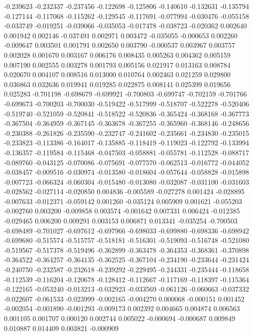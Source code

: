 -0.239623
-0.232337
-0.237456
-0.122698
-0.125806
-0.140610
-0.132631
-0.135794
-0.127144
-0.117068
-0.115262
-0.129545
-0.117691
-0.077994
-0.030476
-0.055158
-0.033749
-0.019251
-0.039066
-0.035053
-0.017478
-0.038723
-0.020362
0.002640
0.001942
0.002146
-0.037491
0.002971
0.003472
-0.035055
-0.000653
0.002260
-0.009647
0.003501
0.001791
0.002650
0.003790
-0.000537
0.003967
0.003757
0.002028
0.001670
0.003167
0.006176
0.008435
0.005263
0.004362
0.005159
0.007190
0.002555
0.003278
0.001793
0.005156
0.021917
0.013163
0.008784
0.020670
0.004107
0.008516
0.013000
0.010764
0.002463
0.021259
0.029800
0.036863
0.032636
0.019941
0.019285
0.022875
0.008141
0.025399
0.019656
0.025283
-0.701198
-0.698679
-0.699921
-0.700803
-0.699747
-0.702159
-0.701766
-0.699673
-0.700203
-0.700030
-0.519422
-0.517999
-0.518707
-0.522278
-0.520406
-0.519740
-0.521059
-0.520841
-0.518522
-0.520836
-0.365424
-0.368168
-0.367773
-0.367504
-0.364959
-0.367145
-0.363678
-0.367255
-0.365960
-0.368146
-0.248656
-0.230388
-0.261826
-0.235590
-0.232747
-0.241602
-0.235661
-0.234830
-0.235015
-0.233823
-0.113386
-0.164017
-0.135885
-0.118419
-0.119023
-0.122792
-0.133994
-0.136357
-0.119584
-0.115468
-0.047503
-0.058881
-0.055781
-0.112528
-0.088717
-0.089760
-0.043125
-0.070086
-0.075691
-0.077570
-0.062513
-0.016772
-0.044052
-0.038457
-0.009516
-0.030974
-0.013580
-0.018604
-0.057644
-0.058828
-0.015898
-0.007723
-0.066324
-0.060304
-0.015480
-0.013080
-0.032087
-0.031100
-0.031603
-0.028562
-0.027114
-0.020850
0.004836
-0.005589
-0.027278
0.001424
-0.028895
-0.007633
-0.012371
-0.059142
0.001260
-0.035124
0.005909
0.001621
-0.055203
-0.002760
0.003200
-0.009858
0.003574
-0.001642
0.007331
0.006424
-0.012385
-0.029465
0.006200
0.009291
0.003153
0.006871
0.013341
-0.035254
-0.700503
-0.698489
-0.701027
-0.697612
-0.697966
-0.698033
-0.699880
-0.698336
-0.698942
-0.699680
-0.515574
-0.515757
-0.518181
-0.516301
-0.519093
-0.516748
-0.521080
-0.519567
-0.517378
-0.519496
-0.362899
-0.363478
-0.364353
-0.368361
-0.370898
-0.364522
-0.364257
-0.364135
-0.362525
-0.367104
-0.234190
-0.233644
-0.231424
-0.240750
-0.232587
-0.232618
-0.239292
-0.229495
-0.244331
-0.235444
-0.118658
-0.112539
-0.116204
-0.120678
-0.128412
-0.112667
-0.117169
-0.118397
-0.115364
-0.122165
-0.053240
-0.013213
-0.032923
-0.033569
-0.061126
-0.060663
-0.037332
-0.022607
-0.061533
-0.023999
-0.002165
-0.004270
0.000068
-0.000151
0.001452
-0.002054
-0.001890
-0.001293
-0.009173
0.002392
0.004665
0.004874
0.006563
0.001105
0.001707
0.000120
0.002744
0.005022
-0.000694
-0.000687
0.009849
0.010887
0.014409
0.003821
-0.000909
